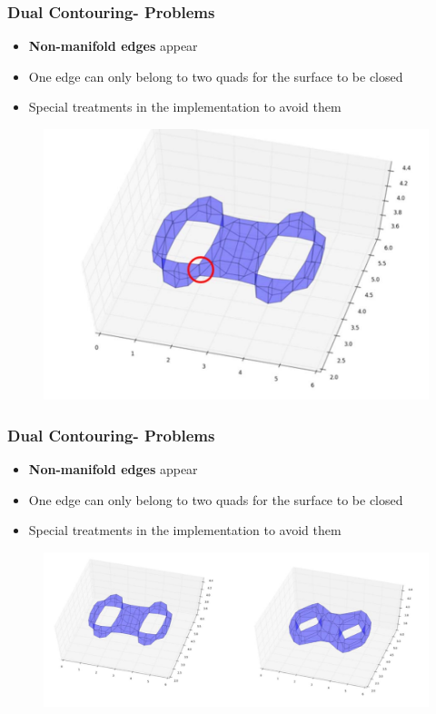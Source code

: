 \begin{frame}

	\frametitle{Dual Contouring- Problems}
	
	\begin{itemize}
	\item  \textbf{Non-manifold edges} appear
	\item One edge can only belong to two quads for the surface to be closed
	\item Special treatments in the implementation to avoid them
	\end{itemize}
	\begin{figure}
	\includegraphics[scale=0.35]{Pictures/DC/manifolds.pdf}
	\end{figure}
	
\end{frame}

\begin{frame}

	\frametitle{Dual Contouring- Problems}
	
	\begin{itemize}
	\item  \textbf{Non-manifold edges} appear
	\item One edge can only belong to two quads for the surface to be closed
	\item Special treatments in the implementation to avoid them
	\end{itemize}
	\begin{figure}
	\includegraphics[scale=0.35]{Pictures/DC/non-manifolds.pdf}
	\end{figure}
	
\end{frame}

